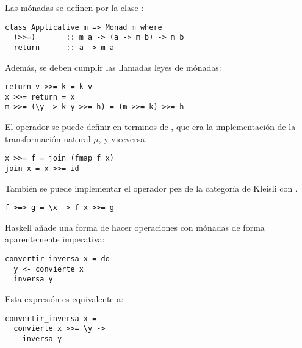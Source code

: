 Las mónadas se definen por la clase :
\begin{verbatim}
class Applicative m => Monad m where
  (>>=)       :: m a -> (a -> m b) -> m b
  return      :: a -> m a
\end{verbatim}
Además, se deben cumplir las llamadas leyes de mónadas:
\begin{verbatim}
return v >>= k = k v
x >>= return = x
m >>= (\y -> k y >>= h) = (m >>= k) >>= h
\end{verbatim}

El operador \code{(>>=)} se puede definir en terminos de , que era la implementación de la transformación natural $\mu$, y viceversa.
\begin{verbatim}
x >>= f = join (fmap f x)
join x = x >>= id
\end{verbatim}
También se puede implementar el operador pez de la categoría de Kleisli \code{(>=>)} con \code{(>>=)}.
\begin{verbatim}
f >=> g = \x -> f x >>= g
\end{verbatim}

Haskell añade una forma de hacer operaciones con mónadas de forma aparentemente imperativa:
\begin{verbatim}
convertir_inversa x = do
  y <- convierte x
  inversa y
\end{verbatim}
Esta expresión es equivalente a:
\begin{verbatim}
convertir_inversa x =
  convierte x >>= \y ->
    inversa y
\end{verbatim}

